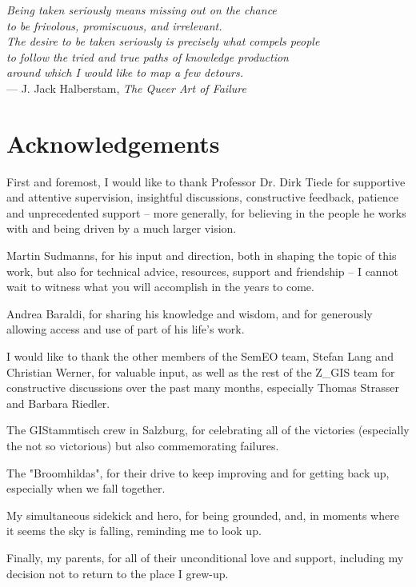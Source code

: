 \cleardoublepage
{}

\begin{flushright}{\slshape
    Being taken seriously means missing out on the chance \\
    to be frivolous, promiscuous, and irrelevant. \\
    The desire to be taken seriously is precisely what compels people \\
    to follow the tried and true paths of knowledge production \\
    around which I would like to map a few detours.} \\ \medskip
    --- J. Jack Halberstam, \emph{The Queer Art of Failure}
\end{flushright}



\bigskip

\begingroup
\let\clearpage\relax
\let\cleardoublepage\relax
\let\cleardoublepage\relax
\chapter*{Acknowledgements}
First and foremost, I would like to thank Professor Dr. Dirk Tiede for supportive and attentive supervision, insightful discussions, constructive feedback, patience and unprecedented support -- more generally, for believing in the people he works with and being driven by a much larger vision.

Martin Sudmanns, for his input and direction, both in shaping the topic of this work, but also for technical advice, resources, support and friendship -- I cannot wait to witness what you will accomplish in the years to come.

Andrea Baraldi, for sharing his knowledge and wisdom, and for generously allowing access and use of part of his life's work.

I would like to thank the other members of the SemEO team, Stefan Lang and Christian Werner, for valuable input, as well as the rest of the Z\_GIS team for constructive discussions over the past many months, especially Thomas Strasser and Barbara Riedler.

The GIStammtisch crew in Salzburg, for celebrating all of the victories (especially the not so victorious) but also commemorating failures.

The "Broomhildas", for their drive to keep improving and for getting back up, especially when we fall together.

My simultaneous sidekick and hero, for being grounded, and, in moments where it seems the sky is falling, reminding me to look up.

Finally, my parents, for all of their unconditional love and support, including my decision not to return to the place I grew-up.

\endgroup
